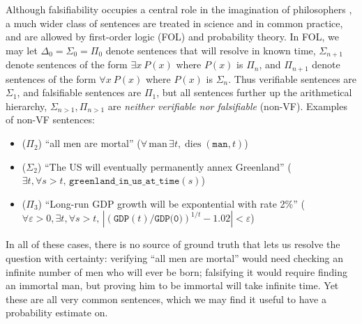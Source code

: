 Although falsifiability occupies a central role in the imagination of philosophers \cite{thorntonKarlPopper2023}, a much wider class of sentences are treated in science and in common practice, and are allowed by first-order logic (FOL) and probability theory. In FOL, we may let $\Delta_0=\Sigma_0=\Pi_0$ denote sentences that will resolve in known time, $\Sigma_{n+1}$ denote sentences of the form $\exists x\ P(x)$ where $P(x)$ is $\Pi_n$, and $\Pi_{n+1}$ denote sentences of the form $\forall x\ P(x)$ where $P(x)$ is $\Sigma_n$. Thus verifiable sentences are $\Sigma_1$, and falsifiable sentences are $\Pi_1$, but all sentences further up the arithmetical hierarchy, $\Sigma_{n>1},\Pi_{n>1}$ are \emph{neither verifiable nor falsifiable} (non-VF). Examples of non-VF sentences:
\begin{itemize}
  \item ($\Pi_2$) ``all men are mortal'' ($\forall\,\mathrm{man}\,\exists t,\operatorname{dies}(\texttt{man}, t)$)
  \item ($\Sigma_2$) ``The US will eventually permanently annex Greenland'' ($\exists t,\forall s>t,\,\texttt{greenland\_in\_us\_at\_time}(s)$)
  \item ($\Pi_3$) ``Long-run GDP growth will be expontential with rate 2\%'' ($\forall\varepsilon>0,\exists t, \forall s>t, \,|\left(\texttt{GDP}(t)/\texttt{GDP(0)}\right)^{1/t}-1.02|<\varepsilon$)
\end{itemize}

In all of these cases, there is no source of ground truth that lets us resolve the question with certainty: verifying ``all men are mortal'' would need checking an infinite number of men who will ever be born; falsifying it would require finding an immortal man, but proving him to be immortal will take infinite time. Yet these are all very common sentences, which we may find it useful to have a probability estimate on.

